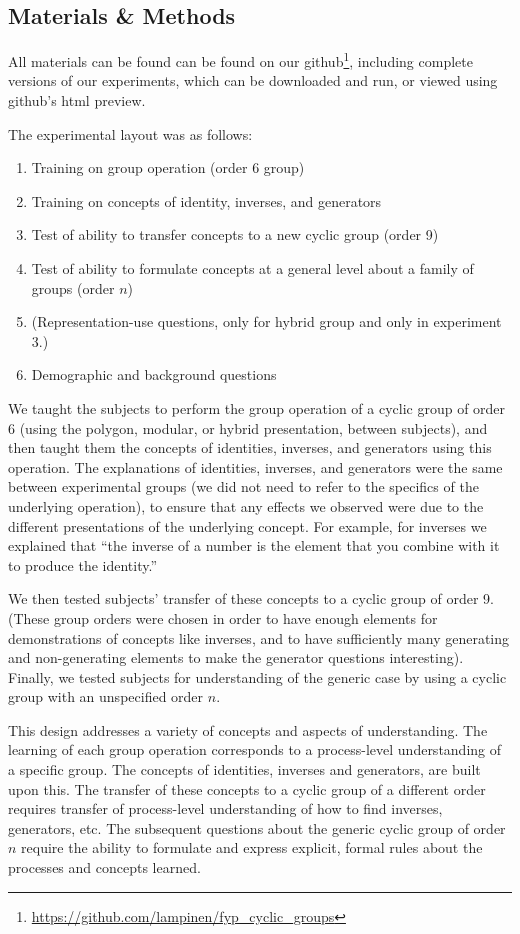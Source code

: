 \documentclass[man,10pt]{apa6}
\begin{document}
\subsection{Materials \& Methods} 
All materials can be found can be found on our github\footnote{\url{https://github.com/lampinen/fyp_cyclic_groups}}, including complete versions of our experiments, which can be downloaded and run, or viewed using github's html preview. \par
The experimental layout was as follows:
\begin{enumerate}
\item Training on group operation (order 6 group)
\item Training on concepts of identity, inverses, and generators
\item Test of ability to transfer concepts to a new cyclic group (order 9)
\item Test of ability to formulate concepts at a general level about a family of groups (order $n$)
\item (Representation-use questions, only for hybrid group and only in experiment 3.)
\item Demographic and background questions
\end{enumerate}
We taught the subjects to perform the group operation of a cyclic group of order 6 (using the polygon, modular, or hybrid presentation, between subjects), and then taught them the concepts of identities, inverses, and generators using this operation. The explanations of identities, inverses, and generators were the same between experimental groups (we did not need to refer to the specifics of the underlying operation), to ensure that any effects we observed were due to the different presentations of the underlying concept. For example, for inverses we explained that ``the inverse of a number is the element that you combine with it to produce the identity.''\par
We then tested subjects' transfer of these concepts to a cyclic group of order 9. (These group orders were chosen in order to have enough elements for demonstrations of concepts like inverses, and to have sufficiently many generating and non-generating elements to make the generator questions interesting). Finally, we tested subjects for understanding of the generic case by using a cyclic group with an unspecified order $n$. \par
This design addresses a variety of concepts and aspects of understanding. The learning of each group operation corresponds to a process-level understanding of a specific group. The concepts of identities, inverses and generators, are built upon this. The transfer of these concepts to a cyclic group of a different order requires transfer of process-level understanding of how to find inverses, generators, etc. The subsequent questions about the generic cyclic group of order $n$ require the ability to formulate and express explicit, formal rules about the processes and concepts learned. 
\end{document}
